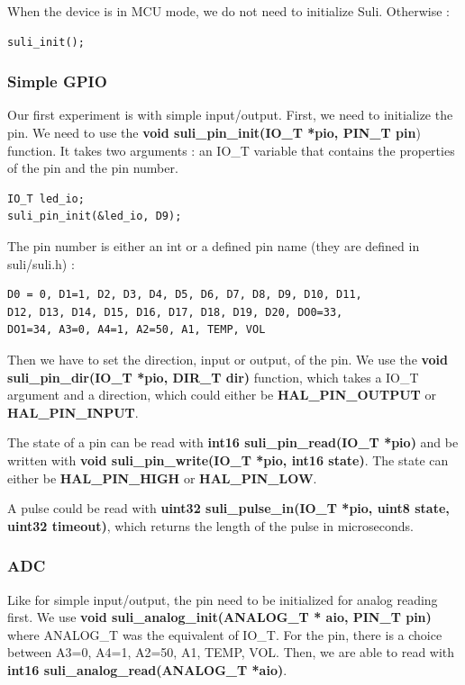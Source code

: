 When the device is in MCU mode, we do not need to initialize Suli. Otherwise :

\begin{lstlisting}[frame=single]
suli_init();
\end{lstlisting}

\subsubsection{Simple GPIO}

Our first experiment is with simple input/output. First, we need to initialize the pin. We need to use the \textbf{void suli\_pin\_init(IO\_T *pio, PIN\_T pin}) function. It takes two arguments : an IO\_T variable that contains the properties of the pin and the pin number.

\begin{lstlisting}[frame=single]
IO_T led_io;
suli_pin_init(&led_io, D9);
\end{lstlisting}

The pin number is either an int or a defined pin name (they are defined in suli/suli.h) :

\begin{lstlisting}[frame=single]
D0 = 0, D1=1, D2, D3, D4, D5, D6, D7, D8, D9, D10, D11,
D12, D13, D14, D15, D16, D17, D18, D19, D20, DO0=33,
DO1=34, A3=0, A4=1, A2=50, A1, TEMP, VOL
\end{lstlisting}

Then we have to set the direction, input or output, of the pin. We use the \textbf{void suli\_pin\_dir(IO\_T *pio, DIR\_T dir)} function, which takes a IO\_T argument and a direction, which could either be \textbf{HAL\_PIN\_OUTPUT} or \textbf{HAL\_PIN\_INPUT}.

The state of a pin can be read with \textbf{int16 suli\_pin\_read(IO\_T *pio)} and be written with \textbf{void suli\_pin\_write(IO\_T *pio, int16 state)}. The state can either be \textbf{HAL\_PIN\_HIGH} or \textbf{HAL\_PIN\_LOW}.

A pulse could be read with \textbf{uint32 suli\_pulse\_in(IO\_T *pio, uint8 state, uint32 timeout)}, which returns the length of the pulse in microseconds.

\subsubsection{ADC}

Like for simple input/output, the pin need to be initialized for analog reading first. We use \textbf{void suli\_analog\_init(ANALOG\_T * aio, PIN\_T pin)} where ANALOG\_T was the equivalent of IO\_T. For the pin, there is a choice between A3=0, A4=1, A2=50, A1, TEMP, VOL. Then, we are able to read with\textbf{ int16 suli\_analog\_read(ANALOG\_T *aio)}.

